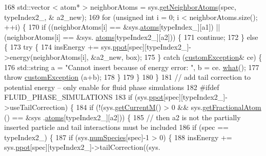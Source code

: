 \begin{DoxyCode}
168             std::vector < atom* > neighborAtoms = sys.\hyperlink{classsim_system_a9b3aeefa22c3b50b5913df6eea753bc6}{getNeighborAtoms}(spec, typeIndex2\_, &
      a2\_new);
169             \textcolor{keywordflow}{for} (\textcolor{keywordtype}{unsigned} \textcolor{keywordtype}{int} i = 0; i < neighborAtoms.size(); ++i) \{
170                 \textcolor{keywordflow}{if} ((neighborAtoms[i] == &sys.\hyperlink{classsim_system_a90421b19082f7fb8fc23b7264b1161e4}{atoms}[typeIndex\_][a1]) || (neighborAtoms[i] == &sys.
      \hyperlink{classsim_system_a90421b19082f7fb8fc23b7264b1161e4}{atoms}[typeIndex2\_][a2])) \{
171                     \textcolor{keywordflow}{continue};
172                 \} \textcolor{keywordflow}{else} \{
173                 \textcolor{keywordflow}{try} \{
174                     insEnergy += sys.\hyperlink{classsim_system_ad2e290b5963f132e6a3a56cee35c8e9f}{ppot}[spec][typeIndex2\_]->energy(neighborAtoms[i], &a2\_new, box);
175                 \} \textcolor{keywordflow}{catch} (\hyperlink{classcustom_exception}{customException}& ce) \{
176                     std::string a = \textcolor{stringliteral}{"Cannot insert because of energy error: "}, b = ce.
      \hyperlink{classcustom_exception_aeb6ab5848b038adfc68fde86a512f691}{what}();
177                     \textcolor{keywordflow}{throw} \hyperlink{classcustom_exception}{customException} (a+b);
178                 \}
179                 \}
180             \}
181             \textcolor{comment}{// add tail correction to potential energy -- only enable for fluid phase simulations}
182 \textcolor{preprocessor}{#ifdef FLUID\_PHASE\_SIMULATIONS}
183 \textcolor{preprocessor}{}            \textcolor{keywordflow}{if} (sys.\hyperlink{classsim_system_ad2e290b5963f132e6a3a56cee35c8e9f}{ppot}[spec][typeIndex2\_]->useTailCorrection) \{
184                 \textcolor{keywordflow}{if} (!(sys.\hyperlink{classsim_system_a299fe4372e610b554eaaf5f5957b2dbc}{getCurrentM}() > 0 && sys.\hyperlink{classsim_system_a2ab77377c60e0e3109a6e875690b0ab7}{getFractionalAtom} () == &sys
      .\hyperlink{classsim_system_a90421b19082f7fb8fc23b7264b1161e4}{atoms}[typeIndex2\_][a2])) \{
185                     \textcolor{comment}{// then a2 is not the partially inserted particle and tail interactions must be
       included}
186                     \textcolor{keywordflow}{if} (spec == typeIndex2\_) \{
187                                 \textcolor{keywordflow}{if} (sys.\hyperlink{classsim_system_a9eea865e6dc1cff377b1e79c4d9c23f0}{numSpecies}[spec]-1 > 0) \{
188                                     insEnergy += sys.\hyperlink{classsim_system_ad2e290b5963f132e6a3a56cee35c8e9f}{ppot}[spec][typeIndex2\_]->tailCorrection((sys.

\end{DoxyCode}
